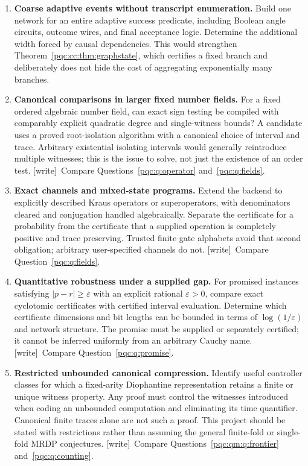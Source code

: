 \documentclass[11pt,letterpaper]{article}
\numberwithin{equation}{section}
\theoremstyle{definition}
\theoremstyle{remark}
\newcommand{\wtag}{\textup{[write]}}
\begin{document}
\begin{enumerate}[label=\textbf{\arabic*.},itemsep=0.7em]
\item \textbf{Coarse adaptive events without transcript enumeration.}
Build one network for an entire adaptive success predicate, including Boolean
angle circuits, outcome wires, and final acceptance logic. Determine the
additional width forced by causal dependencies. This would strengthen
Theorem~\ref{pqc:cc:thm:graphstate}, which certifies a fixed branch and deliberately
does not hide the cost of aggregating exponentially many branches.

\item \textbf{Canonical comparisons in larger fixed number fields.}
For a fixed ordered algebraic number field, can exact sign testing be compiled
with comparably explicit quadratic degree and single-witness bounds? A
candidate uses a proved root-isolation algorithm with a canonical choice of
interval and trace. Arbitrary existential isolating intervals would generally
reintroduce multiple witnesses; this is the issue to solve, not just the
existence of an order test. \wtag\ Compare Questions~\ref{pqc:q:operator} and~\ref{pqc:q:fields}.

\item \textbf{Exact channels and mixed-state programs.}
Extend the backend to explicitly described Kraus operators or superoperators,
with denominators cleared and conjugation handled algebraically. Separate the
certificate for a probability from the certificate that a supplied operation
is completely positive and trace preserving. Trusted finite gate alphabets
avoid that second obligation; arbitrary user-specified channels do not. \wtag\ Compare Question~\ref{pqc:q:fields}.

\item \textbf{Quantitative robustness under a supplied gap.}
For promised instances satisfying $|p-r|\ge\varepsilon$ with an explicit
rational $\varepsilon>0$, compare exact cyclotomic certificates with certified
interval evaluation. Determine which certificate dimensions and bit lengths
can be bounded in terms of $\log(1/\varepsilon)$ and network structure.
The promise must be supplied or separately certified; it cannot be inferred
uniformly from an arbitrary Cauchy name. \wtag\ Compare Question~\ref{pqc:q:promise}.

\item \textbf{Restricted unbounded canonical compression.}
Identify useful controller classes for which a fixed-arity Diophantine
representation retains a finite or unique witness property. Any proof must
control the witnesses introduced when coding an unbounded computation and
eliminating its time quantifier. Canonical finite traces alone are not such a
proof. This project should be stated with restrictions rather than assuming
the general finite-fold or single-fold MRDP conjectures. \wtag\ Compare Questions~\ref{pqc:qm:q:frontier} and~\ref{pqc:q:counting}.


\end{enumerate}
\end{document}
